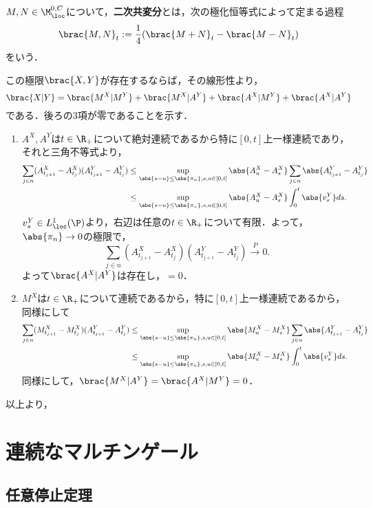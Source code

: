 \documentclass[uplatex,dvipdfmx]{jsreport}
\begin{document}
\begin{definition}
    $M,N\in\M^{0,C}_\loc$について，\textbf{二次共変分}とは，次の極化恒等式によって定まる過程
    \[\brac{M,N}_t:=\frac{1}{4}(\brac{M+N}_t-\brac{M-N}_t)\]
    をいう．
\end{definition}

\begin{Proof}
    この極限$\brac{X,Y}$が存在するならば，その線形性より，
    \[\brac{X|Y}=\brac{M^X|M^Y}+\brac{M^X|A^Y}+\brac{A^X|M^Y}+\brac{A^X|A^Y}\]
    である．後ろの3項が零であることを示す．
    \begin{enumerate}
        \item $A^X,A^Y$は$t\in\R_+$について絶対連続であるから特に$[0,t]$上一様連続であり，それと三角不等式より，
        \begin{align*}
            \sum_{j\in n}(A^X_{t_{j+1}}-A^X_{t_j})(A^Y_{t_{j+1}}-A^Y_{t_j})&\le\sup_{\abs{s-u}\le\abs{\pi_n},s,u\in[0,t]}\abs{A^X_u-A^X_s}\sum_{j\in n}\abs{A^Y_{t_{j+1}}-A^Y_{t_j}}\\
            &\le\sup_{\abs{s-u}\le\abs{\pi_n},s,u\in[0,t]}\abs{A^X_u-A^X_s}\int^t_0\abs{v_s^Y}ds.
        \end{align*}
        $v_s^Y\in L^1_\loc(\P)$より，右辺は任意の$t\in\R_+$について有限．よって，$\abs{\pi_n}\to0$の極限で，
        \[\sum_{j\in n}(A^X_{t_{j+1}}-A^X_{t_j})(A^Y_{t_{j+1}}-A^Y_{t_j})\xrightarrow{P}0.\]
        よって$\brac{A^X|A^Y}$は存在し，$=0$．
        \item $M^X$は$t\in\R_+$について連続であるから，特に$[0,t]$上一様連続であるから，同様にして
        \begin{align*}
            \sum_{j\in n}(M^X_{t_{j+1}}-M^X_{t_j})(A^Y_{t_{j+1}}-A^Y_{t_j})&\le\sup_{\abs{s-u}\le\abs{\pi_n},s,u\in[0,t]}\abs{M^X_u-M^X_s}\sum_{j\in n}\abs{A^Y_{t_{j+1}}-A^Y_{t_j}}\\
            &\le\sup_{\abs{s-u}\le\abs{\pi_n},s,u\in[0,t]}\abs{M^X_u-M^X_s}\int^t_0\abs{v_s^Y}ds.
        \end{align*}
        同様にして，$\brac{M^X|A^Y}=\brac{A^X|M^Y}=0$．
    \end{enumerate}
    以上より，
\end{Proof}

\section{連続なマルチンゲール}

\subsection{任意停止定理}
\end{document}
